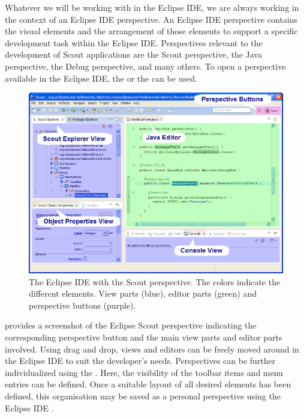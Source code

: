 \documentclass[a4paper,10pt,twoside]{book}
\begin{document}
Whatever we will be working with in the Eclipse IDE, we are always working in the context of an Eclipse IDE perspective. 
An Eclipse IDE perspective contains the visual elements and the arrangement of those elements to support a specific development task within the Eclipse IDE. 
Perspectives relevant to the development of Scout applications are the Scout perspective, the Java perspective, the Debug perspective, and many others. 
To open a perspective available in the Eclipse IDE, the  or the  can be used. 

\begin{figure}
\includegraphics[width=14cm]{eclipse_ide_parts.png} 
\caption{The Eclipse IDE with the Scout perspective. The colors indicate the different elements. View parts (blue), editor parts (green) and perspective buttons (purple). }
\end{figure}

 provides a screenshot of the Eclipse Scout perspective indicating the corresponding perspective button and the main view parts and editor parts involved. 
Using drag and drop, views and editors can be freely moved around in the Eclipse IDE to suit the developer's needs.
Perspectives can be further individualized using the . 
Here, the visibility of the toolbar items and menu entries can be defined. 
Once a suitable layout of all desired elements has been defined, this organisation may be saved as a personal perspective using the Eclipse IDE .
\end{document}
